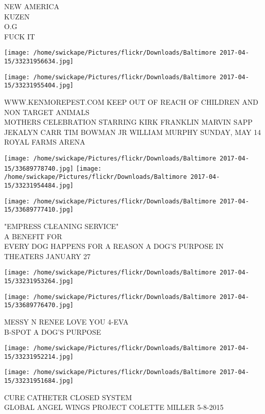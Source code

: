 \documentclass[10pt,letterpaper]{article}
\begin{document}
NEW AMERICA\\
KUZEN\\
O.G\\
FUCK IT
\pagebreak

\texttt{[image: /home/swickape/Pictures/flickr/Downloads/Baltimore 2017-04-15/33231956634.jpg]}

\vspace{0.25in}
\texttt{[image: /home/swickape/Pictures/flickr/Downloads/Baltimore 2017-04-15/33231955404.jpg]}

WWW.KENMOREPEST.COM KEEP OUT OF REACH OF CHILDREN AND NON TARGET ANIMALS\\
MOTHERS CELEBRATION STARRING KIRK FRANKLIN MARVIN SAPP JEKALYN CARR TIM BOWMAN JR WILLIAM MURPHY SUNDAY, MAY 14 ROYAL FARMS ARENA
\pagebreak

\texttt{[image: /home/swickape/Pictures/flickr/Downloads/Baltimore 2017-04-15/33689778740.jpg]}
\texttt{[image: /home/swickape/Pictures/flickr/Downloads/Baltimore 2017-04-15/33231954484.jpg]}

\texttt{[image: /home/swickape/Pictures/flickr/Downloads/Baltimore 2017-04-15/33689777410.jpg]}

"EMPRESS CLEANING SERVICE"\\
A BENEFIT FOR\\
EVERY DOG HAPPENS FOR A REASON A DOG'S PURPOSE IN THEATERS JANUARY 27
\pagebreak

\texttt{[image: /home/swickape/Pictures/flickr/Downloads/Baltimore 2017-04-15/33231953264.jpg]}

\vspace{0.25in}
\texttt{[image: /home/swickape/Pictures/flickr/Downloads/Baltimore 2017-04-15/33689776470.jpg]}

MESSY N RENEE LOVE YOU 4{-}EVA\\
B{-}SPOT A DOG'S PURPOSE
\pagebreak

\texttt{[image: /home/swickape/Pictures/flickr/Downloads/Baltimore 2017-04-15/33231952214.jpg]}

\vspace{0.25in}
\texttt{[image: /home/swickape/Pictures/flickr/Downloads/Baltimore 2017-04-15/33231951684.jpg]}

CURE CATHETER CLOSED SYSTEM\\
GLOBAL ANGEL WINGS PROJECT COLETTE MILLER 5{-}8{-}2015
\pagebreak
\end{document}
